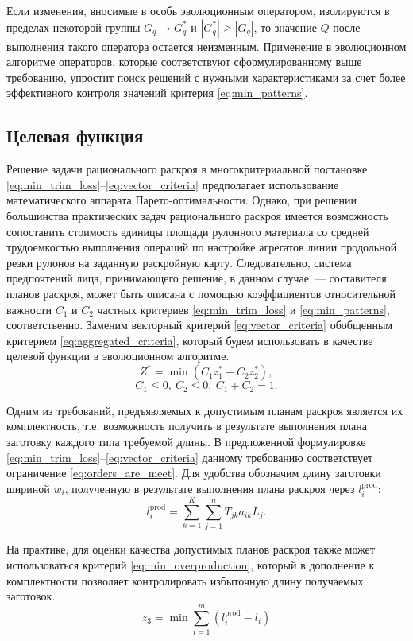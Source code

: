 \documentclass[12pt]{article}
\begin{document}
Если изменения, вносимые в особь эволюционным оператором, изолируются в 
пределах некоторой группы $G_q \rightarrow G_q^*$ и $|G_q^*| \geq |G_q|$, то 
значение $Q$ после выполнения такого оператора остается неизменным. Применение 
в эволюционном алгоритме операторов, которые соответствуют сформулированному 
выше требованию, упростит поиск решений с нужными характеристиками за счет 
более эффективного контроля значений критерия 
\eqref{eq:min_patterns}.

\subsection{Целевая функция}

Решение задачи рационального раскроя в многокритериальной постановке 
\eqref{eq:min_trim_loss}--\eqref{eq:vector_criteria}
предполагает использование математического аппарата Парето-оптимальности. 
Однако, при решении большинства практических задач рационального раскроя 
имеется возможность сопоставить стоимость единицы площади рулонного материала 
со средней трудоемкостью выполнения операций по настройке агрегатов линии 
продольной резки рулонов на заданную раскройную карту. Следовательно, система 
предпочтений лица, принимающего решение, в данном случае~--- составителя планов 
раскроя, может быть описана с помощью коэффициентов относительной важности 
$C_1$ и $C_2$ частных критериев 
\eqref{eq:min_trim_loss} и 
\eqref{eq:min_patterns}, 
соответственно. Заменим векторный 
критерий 
\eqref{eq:vector_criteria}
обобщенным критерием 
\eqref{eq:aggregated_criteria}, 
который будем использовать в качестве 
целевой функции в эволюционном алгоритме.
\begin{equation}\label{eq:aggregated_criteria}
    Z^*=\min{(C_1z_1^*+C_2z_2^*)},
\end{equation}
\[C_1 \leq 0, \: C_2 \leq 0, \: C_1+C_2=1.\]

Одним из требований, предъявляемых к допустимым планам раскроя является их 
комплектность, т.е. возможность получить в результате выполнения плана 
заготовку каждого типа требуемой длины. В предложенной формулировке 
\eqref{eq:min_trim_loss}--\eqref{eq:vector_criteria}
данному требованию соответствует ограничение 
\eqref{eq:orders_are_meet}. 
Для удобства обозначим длину 
заготовки шириной $w_i$, полученную в результате выполнения плана раскроя 
через $l_i^{\text{prod}}$:
\[ l_i^{\text{prod}}=\sum_{k=1}^{K} \sum_{j=1}^{n} T_{jk}a_{ik}L_j. \]

На практике, для оценки качества допустимых планов раскроя также может 
использоваться критерий 
\eqref{eq:min_overproduction}, 
который в дополнение к комплектности позволяет 
контролировать избыточную длину получаемых заготовок.
\begin{equation}\label{eq:min_overproduction}
    z_3=\min{\sum_{i=1}^{m} \left( l_i^{\text{prod}}-l_i \right)}
\end{equation}
\end{document}
